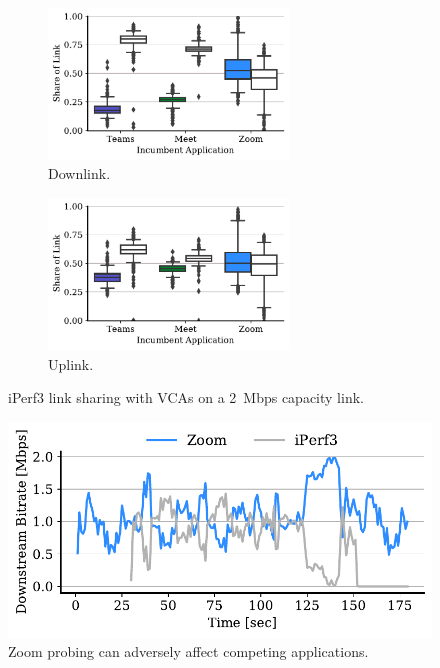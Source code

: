 
\begin{figure}[t!]
\centering
\begin{subfigure}[t]{.5\textwidth}
    \centering
    \includegraphics[width=0.7\textwidth]{figures/comp/box_plot_iperf_dl_2.0_all.pdf}
    \caption{Downlink.}
    \label{subfig:boxplot-iperf-dl}
\end{subfigure}\hfill
\begin{subfigure}[t]{.5\textwidth}
    \centering
    \includegraphics[width=0.7\textwidth]{figures/comp/box_plot_iperfup_ul_2.0_all.pdf}
    \caption{Uplink.}
    \label{subfig:boxplot-iperf-ul}
\end{subfigure}
\caption{iPerf3 link sharing with VCAs on a 2~Mbps capacity link.}
\label{fig:boxplot-iperf}
\end{figure}

\begin{figure}[th]
    \centering
    \includegraphics[width=\linewidth]{figures/comp_ts/zoom_iperf_2_dl_r3.pdf}
    \caption{Zoom probing can adversely affect competing applications.}
	\label{fig:zoom-iperf-dl-2}
\end{figure}


